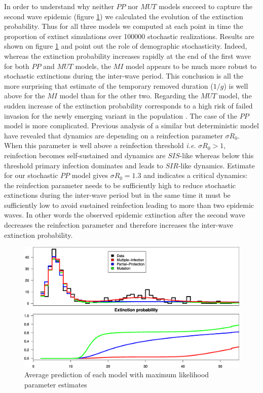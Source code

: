 In order to understand why neither $PP$ nor $MUT$ models succeed to
capture the second wave epidemic (figure \ref{res1}) we calculated the
evolution of the extinction probability. Thus for all three models we
computed at each point in time the proportion of extinct simulations
over 100000 stochastic realizations. Results are shown on figure
\ref{res1} and point out the role of demographic
stochasticity. Indeed, whereas the extinction probability increases
rapidly at the end of the first wave for both $PP$ and $MUT$ models,
the $MI$ model appears to be much more robust to stochastic
extinctions during the inter-wave period. This conclusion is all the
more surprising that estimate of the temporary removed duration
($1/g$) is well above for the $MI$ model than for the other two.
Regarding the $MUT$ model, the sudden increase of the extinction
probability corresponds to a high risk of failed invasion for the
newly emerging variant in the population \citep{Lloyd-Smith2005}. The
case of the $PP$ model is more complicated. Previous analysis of a
similar but deterministic model \citep{Gomes2004,Gomes2005} have
revealed that dynamics are depending on a reinfection parameter
$\sigma R_{0}$. When this parameter is well above a reinfection
threshold \textit{i.e.} $\sigma R_{0}>1$, reinfection becomes
self-sustained and dynamics are $SIS$-like whereas below this
threshold primary infection dominates and leads to $SIR$-like
dynamics. Estimate for our stochastic $PP$ model gives $\sigma
R_{0}=1.3$ and indicates a critical dynamics: the reinfection
parameter needs to be sufficiently high to reduce stochastic
extinctions during the inter-wave period but in the same time it must
be sufficiently low to avoid sustained reinfection leading to more
than two epidemic waves. In other words the observed epidemic
extinction after the second wave decreases the reinfection parameter
and therefore increases the inter-wave extinction probability.

\begin{figure}
\includegraphics[width=0.9\linewidth]{texte/tdc/graph/res_et_extinction.eps}
\caption{Average prediction of each model with maximum likelihood parameter estimates}
\label{res1}
\end{figure}

